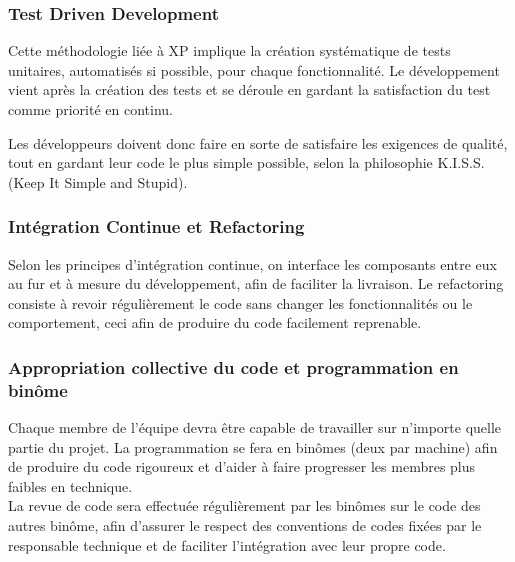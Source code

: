 \documentclass{../../res/univ-projet}
\begin{document}
	\subsubsection{Test Driven Development}
	
Cette méthodologie liée à XP implique la création systématique de tests unitaires, automatisés si possible, pour chaque fonctionnalité. Le développement vient après la création des tests et se déroule en gardant la satisfaction du test comme priorité en continu.

Les développeurs doivent donc faire en sorte de satisfaire les exigences de qualité, tout en gardant leur code le plus simple possible, selon la philosophie K.I.S.S. (Keep It Simple and Stupid).
	 
	 \subsubsection{Intégration Continue et Refactoring}
	 
Selon les principes d'intégration continue, on interface les composants entre eux au fur et à mesure du développement, afin de faciliter la livraison. Le refactoring  consiste à revoir régulièrement le code sans changer les fonctionnalités ou le comportement, ceci afin de produire du code facilement reprenable.

\subsubsection{Appropriation collective du code et programmation en binôme}

Chaque membre de l'équipe devra être capable de travailler sur n'importe quelle partie du projet. La programmation se fera en binômes (deux par machine) afin de produire du code rigoureux et d'aider à faire progresser les membres plus faibles en technique. \\

La revue de code sera effectuée régulièrement	par les binômes sur le code des autres binôme, afin d'assurer le respect des conventions de codes fixées par le responsable technique et de faciliter l'intégration avec leur propre code.
\end{document}
